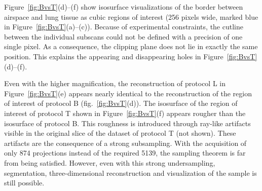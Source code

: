 Figure~\ref{fig:BvsT}(d)--(f) show isosurface visualizations of the border between airspace and lung tissue as cubic regions of interest (256 pixels wide, marked blue in Figure~\ref{fig:BvsT}(a)--(c)). Because of experimental constraints, the cutline between the individual subscans could not be defined with a precision of one single pixel. As a consequence, the clipping plane does not lie in exactly the same position. This explains the appearing and disappearing holes in Figure~\ref{fig:BvsT}(d)--(f).

Even with the higher magnification, the reconstruction of protocol L in Figure~\ref{fig:BvsT}(e) appears nearly identical to the reconstruction of the region of interest of protocol B (fig.~\ref{fig:BvsT}(d)). The isosurface of the region of interest of protocol T shown in Figure~\ref{fig:BvsT}(f) appears rougher than the isosurface of protocol B. This roughness is introduced through ray-like artifacts visible in the original slice of the dataset of protocol T (not shown). These artifacts are the consequence of a strong subsampling. With the acquisition of only 874 projections instead of the required 5139, the sampling theorem is far from being satisfied. However, even with this strong undersampling, segmentation, three-dimensional reconstruction and visualization of the sample is still possible.

